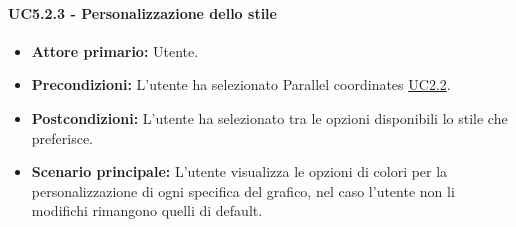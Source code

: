 \paragraph{UC5.2.3 - Personalizzazione dello stile}
\label{sec:UC5.2.3}
    \begin{itemize}
        \item \textbf{Attore primario:} Utente.
        \item \textbf{Precondizioni:} L'utente ha selezionato Parallel coordinates \hyperref[sec:UC2.2]{UC2.2}.
	    \item \textbf{Postcondizioni:} L'utente ha selezionato tra le opzioni disponibili lo stile che preferisce.
	    \item \textbf{Scenario principale:} L'utente visualizza le opzioni di colori per la personalizzazione di ogni specifica del grafico, nel caso l'utente non li modifichi rimangono quelli di default.
    \end{itemize}


\newpage
